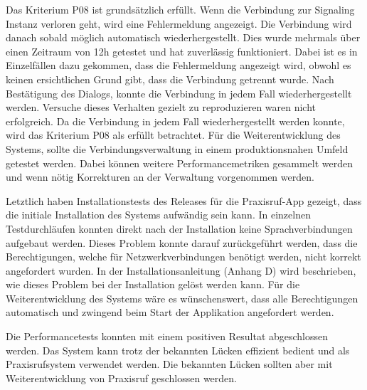 Das Kriterium P08 ist grundsätzlich erfüllt.
Wenn die Verbindung zur Signaling Instanz verloren geht, wird eine Fehlermeldung angezeigt.
Die Verbindung wird danach sobald möglich automatisch wiederhergestellt.
Dies wurde mehrmals über einen Zeitraum von 12h getestet und hat zuverlässig funktioniert.
Dabei ist es in Einzelfällen dazu gekommen, dass die Fehlermeldung angezeigt wird, obwohl es keinen ersichtlichen Grund gibt, dass die Verbindung getrennt wurde.
Nach Bestätigung des Dialogs, konnte die Verbindung in jedem Fall wiederhergestellt werden.
Versuche dieses Verhalten gezielt zu reproduzieren waren nicht erfolgreich.
Da die Verbindung in jedem Fall wiederhergestellt werden konnte, wird das Kriterium P08 als erfüllt betrachtet.
Für die Weiterentwicklung des Systems, sollte die Verbindungsverwaltung in einem produktionsnahen Umfeld getestet werden.
Dabei können weitere Performancemetriken gesammelt werden und wenn nötig Korrekturen an der Verwaltung vorgenommen werden.

Letztlich haben Installationstests des Releases für die Praxisruf-App gezeigt, dass die initiale Installation des Systems aufwändig sein kann.
In einzelnen Testdurchläufen konnten direkt nach der Installation keine Sprachverbindungen aufgebaut werden.
Dieses Problem konnte darauf zurückgeführt werden, dass die Berechtigungen, welche für Netzwerkverbindungen benötigt werden, nicht korrekt angefordert wurden.
In der Installationsanleitung (Anhang D) wird beschrieben, wie dieses Problem bei der Installation gelöst werden kann.
Für die Weiterentwicklung des Systems wäre es wünschenswert, dass alle Berechtigungen automatisch und zwingend beim Start der Applikation angefordert werden.

Die Performancetests konnten mit einem positiven Resultat abgeschlossen werden.
Das System kann trotz der bekannten Lücken effizient bedient und als Praxisrufsystem verwendet werden.
Die bekannten Lücken sollten aber mit Weiterentwicklung von Praxisruf geschlossen werden.

\clearpage

